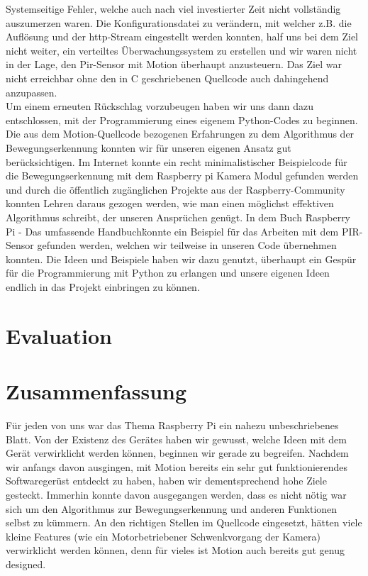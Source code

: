 \documentclass[journal]{IEEEtran}
\begin{document}
Systemseitige Fehler, welche auch nach viel investierter Zeit nicht vollständig auszumerzen waren. Die Konfigurationsdatei zu verändern, mit welcher z.B. die Auflösung und der http-Stream eingestellt werden konnten, half uns bei dem Ziel nicht weiter, ein verteiltes Überwachungssystem zu erstellen und wir waren nicht in der Lage, den Pir-Sensor mit Motion überhaupt anzusteuern. Das Ziel war nicht erreichbar ohne den in C geschriebenen Quellcode auch dahingehend anzupassen. \\ Um einem erneuten Rückschlag vorzubeugen haben wir uns dann dazu entschlossen, mit der Programmierung eines eigenem Python-Codes zu beginnen. Die aus dem Motion-Quellcode bezogenen Erfahrungen zu dem Algorithmus der Bewegungserkennung konnten wir für unseren eigenen Ansatz gut berücksichtigen. Im Internet konnte ein recht minimalistischer Beispielcode für die Bewegungserkennung mit dem Raspberry pi Kamera Modul gefunden werden\cite{motioncode} und durch die öffentlich zugänglichen Projekte aus der Raspberry-Community konnten Lehren daraus gezogen werden, wie man einen möglichst effektiven Algorithmus schreibt, der unseren Ansprüchen genügt. In dem Buch \"Raspberry Pi - Das umfassende Handbuch\" konnte ein Beispiel für das Arbeiten mit dem PIR-Sensor gefunden werden\cite[S. 495]{Raspi}, welchen wir teilweise in unseren Code übernehmen konnten. Die Ideen und Beispiele haben wir dazu genutzt, überhaupt ein Gespür für die Programmierung mit Python zu erlangen und unsere eigenen Ideen endlich in das Projekt einbringen zu können. \\



\section{Evaluation}




\section{Zusammenfassung}
Für jeden von uns war das Thema Raspberry Pi ein nahezu unbeschriebenes Blatt. Von der Existenz des Gerätes haben wir gewusst, welche Ideen mit dem Gerät verwirklicht werden können, beginnen wir gerade zu begreifen. Nachdem wir anfangs davon ausgingen, mit Motion bereits ein sehr gut funktionierendes Softwaregerüst entdeckt zu haben, haben wir dementsprechend hohe Ziele gesteckt. Immerhin konnte davon ausgegangen werden, dass es nicht nötig war sich um den Algorithmus zur Bewegungserkennung und anderen Funktionen selbst zu kümmern. An den richtigen Stellen im Quellcode eingesetzt, hätten viele kleine Features (wie ein Motorbetriebener Schwenkvorgang der Kamera) verwirklicht werden können, denn für vieles ist Motion auch bereits gut genug designed. 




\printbibliography
\end{document}
